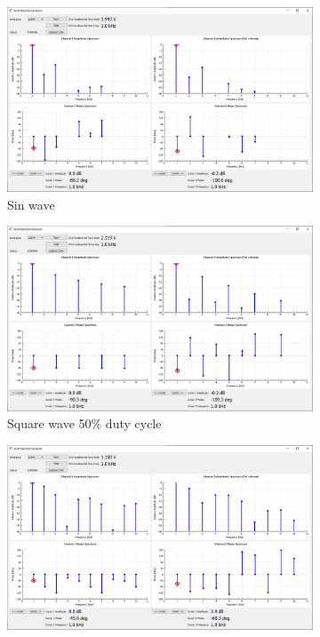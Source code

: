 \documentclass[notitlepage, a4paper, 11pt]{article}
\begin{document}
		\begin{figure}[H]
		\centering
		\begin{subfigure}[][][t]{0.23\textwidth}
			\includegraphics[width=\textwidth]{../img/Circuit1/sin}
			\caption{Sin wave}
		\end{subfigure}
		\hfill
		\begin{subfigure}[][][t]{0.23\textwidth}
			\includegraphics[width=\textwidth]{../img/Circuit1/dut50}
			\caption{Square wave 50\% duty cycle}
		\end{subfigure}
		\hfill
		\begin{subfigure}[][][t]{0.23\textwidth}
			\includegraphics[width=\textwidth]{../img/Circuit1/dut25}

\end{subfigure}
\end{figure}
\end{document}
